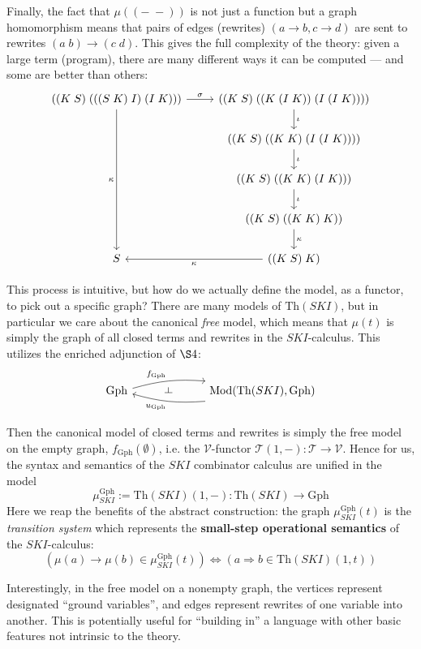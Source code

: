 \documentclass{amsart}
\theoremstyle{definition}
\def\ld{\rotatebox[origin=c]{-90}{$\dashv$}} %
\newcommand{\Th}{\mathrm{Th}}
\newcommand{\Gph}{\mathrm{Gph}}
\newcommand{\Mod}{\mathrm{Mod}}
\newcommand{\V}{\mathscr{V}}
\newcommand{\T}{\mathscr{T}}
\newcommand{\maps}{\colon}
\begin{document}
Finally, the fact that $\mu((-\;-))$ is not just a function but a graph homomorphism means that pairs of edges (rewrites) $(a\to b, c\to d)$ are sent to rewrites $(a\; b) \to (c\; d)$. This gives the full complexity of the theory: given a large term (program), there are many different ways it can be computed --- and some are better than others:
\[\begin{tikzcd}
	((K\; S)\; (((S\; K)\; I)\; (I\; K))) \arrow[r,"\sigma"] \arrow[dddd,swap,"\kappa"] & ((K\; S)\; ((K\;(I\; K))\; (I\; (I\; K)))) \arrow[d,"\iota"]\\
	& ((K\; S)\; ((K\; K)\; (I\; (I\; K)))) \arrow[d,"\iota"]\\
	& ((K\; S)\; ((K\; K)\; (I\; K))) \arrow[d,"\iota"]\\
	& ((K\; S)\; ((K\; K)\; K)) \arrow[d,"\kappa"]\\
	S & ((K\; S)\; K)\arrow[l,"\kappa"]
\end{tikzcd}\]

This process is intuitive, but how do we actually define the model, as a functor, to pick out a specific graph? There are many models of $\Th(SKI)$, but in particular we care about the canonical \textit{free} model, which means that $\mu(t)$ is simply the graph of all closed terms and rewrites in the $SKI$-calculus. This utilizes the enriched adjunction of $\S4$:
\[\begin{tikzcd}
\Gph \arrow[bend left=10,"f_\Gph"]{rr}
& \ld &
\arrow[bend left=10,"u_\Gph"]{ll} \Mod(\Th(SKI),\Gph)
\end{tikzcd}\]

Then the canonical model of closed terms and rewrites is simply the free model on the empty graph, $f_\Gph(\emptyset)$, i.e. the $\V$-functor $\T(1,-)\maps\T\to \V$. Hence for us, the syntax and semantics of the $SKI$ combinator calculus are unified in the model $$\mu_{SKI}^\Gph:= \Th(SKI)(1,-)\maps \Th(SKI) \to \Gph$$ Here we reap the benefits of the abstract construction: the graph $\mu_{SKI}^\Gph(t)$ is the \textit{transition system} which represents the \textbf{small-step operational semantics} of the $SKI$-calculus: $$(\mu(a) \to \mu(b) \in \mu_{SKI}^\Gph(t)) \iff (a \Rightarrow b \in \Th(SKI)(1,t))$$

Interestingly, in the free model on a nonempty graph, the vertices represent designated ``ground variables'', and edges represent rewrites of one variable into another. This is potentially useful for ``building in'' a language with other basic features not intrinsic to the theory.
\end{document}
